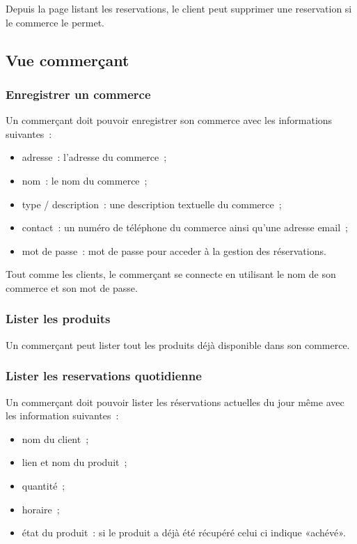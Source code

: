 \documentclass[a4paper,12pt]{article}
\begin{document}
Depuis la page listant les reservations, le client peut supprimer une reservation si le commerce le permet.

\subsection{Vue commerçant}

\subsubsection{Enregistrer un commerce}

Un commerçant doit pouvoir enregistrer son commerce avec les informations suivantes~:

\begin{itemize}
	\item adresse~: l'adresse du commerce~;
	\item nom~: le nom du commerce~;
	\item type / description~: une description textuelle du commerce~;
	\item contact~: un numéro de téléphone du commerce ainsi qu'une adresse email~;
	\item mot de passe~: mot de passe pour acceder à la gestion des réservations.
\end{itemize}

Tout comme les clients, le commerçant se connecte en utilisant le nom de son commerce et son mot de passe.

\subsubsection{Lister les produits}

Un commerçant peut lister tout les produits déjà disponible dans son commerce.

\subsubsection{Lister les reservations quotidienne}

Un commerçant doit pouvoir lister les réservations actuelles du jour même avec les information suivantes~:

\begin{itemize}
	\item nom du client~;
	\item lien et nom du produit~;
	\item quantité~;
	\item horaire~;
	\item état du produit~: si le produit a déjà été récupéré celui ci indique «achévé».
\end{itemize}
\end{document}
